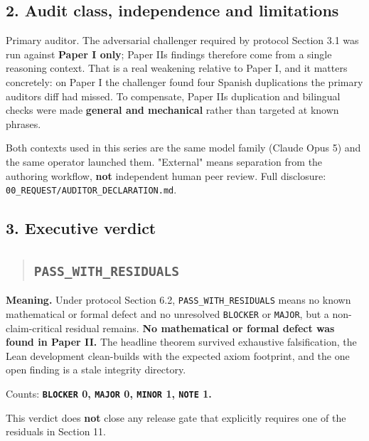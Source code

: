 \documentclass[
  9pt,
  a4paper,
]{article}
\begin{document}
\subsection{2. Audit class, independence and
limitations}\label{2-audit-class-independence-and-limitations}

Primary auditor. The adversarial challenger required by protocol Section
3.1 was run against \textbf{Paper I only}; Paper II\textquotesingle s
findings therefore come from a single reasoning context. That is a real
weakening relative to Paper I, and it matters concretely: on Paper I the
challenger found four Spanish duplications the primary
auditor\textquotesingle s diff had missed. To compensate, Paper
II\textquotesingle s duplication and bilingual checks were made
\textbf{general and mechanical} rather than targeted at known phrases.

Both contexts used in this series are the same model family (Claude Opus
5) and the same operator launched them. "External" means separation from
the authoring workflow, \textbf{not} independent human peer review. Full
disclosure: \texttt{00\_REQUEST/AUDITOR\_DECLARATION.md}.

\subsection{3. Executive verdict}\label{3-executive-verdict}

\begin{quote}
\mbox{}%
\subsection{\texorpdfstring{\texttt{PASS\_WITH\_RESIDUALS}}{PASS\_WITH\_RESIDUALS}}\label{pass_with_residuals}
\end{quote}

\textbf{Meaning.} Under protocol Section 6.2,
\texttt{PASS\_WITH\_RESIDUALS} means no known mathematical or formal
defect and no unresolved \texttt{BLOCKER} or \texttt{MAJOR}, but a
non-claim-critical residual remains. \textbf{No mathematical or formal
defect was found in Paper II.} The headline theorem survived exhaustive
falsification, the Lean development clean-builds with the expected axiom
footprint, and the one open finding is a stale integrity directory.

Counts: \textbf{\texttt{BLOCKER} 0, \texttt{MAJOR} 0, \texttt{MINOR} 1,
\texttt{NOTE} 1.}

This verdict does \textbf{not} close any release gate that explicitly
requires one of the residuals in Section 11.
\end{document}
